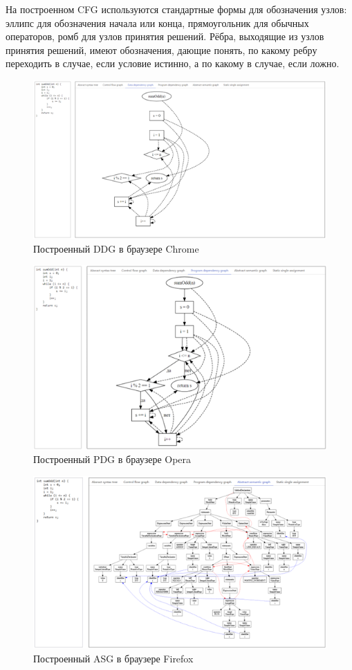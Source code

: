На построенном CFG используются стандартные формы для обозначения узлов: эллипс для обозначения начала или конца, прямоугольник для обычных операторов, ромб для узлов принятия решений. Рёбра, выходящие из узлов принятия решений, имеют обозначения, дающие понять, по какому ребру переходить в случае, если условие истинно, а по какому в случае, если ложно.
\begin{figure}[ht!] 
	\center
	\includegraphics [scale=0.27] {my_folder/images/my/23}
	\caption{Построенный DDG в браузере Chrome} 
	\label{fig:23}  
\end{figure}
\begin{figure}[ht!] 
	\center
	\includegraphics [scale=0.27] {my_folder/images/my/24}
	\caption{Построенный PDG в браузере Opera} 
	\label{fig:24}  
\end{figure}
\begin{figure}[ht!] 
	\center
	\includegraphics [scale=0.27] {my_folder/images/my/25}
	\caption{Построенный ASG в браузере Firefox} 
	\label{fig:25}  
\end{figure}
